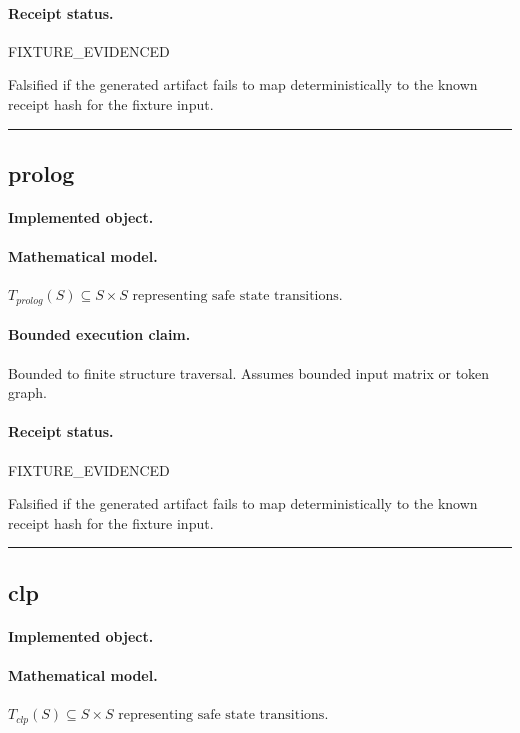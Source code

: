 \paragraph{Receipt status.} FIXTURE\_EVIDENCED
\begin{falsifier}
Falsified if the generated artifact fails to map deterministically to the known receipt hash for the fixture input.
\end{falsifier}

\vspace{1em}\hrule\vspace{1em}
\subsection{prolog}
\paragraph{Implemented object.} 
\paragraph{Mathematical model.} $T_{prolog}(S) \subseteq S \times S \text{ representing safe state transitions}.$
\paragraph{Bounded execution claim.} Bounded to finite structure traversal. Assumes bounded input matrix or token graph.
\paragraph{Receipt status.} FIXTURE\_EVIDENCED
\begin{falsifier}
Falsified if the generated artifact fails to map deterministically to the known receipt hash for the fixture input.
\end{falsifier}

\vspace{1em}\hrule\vspace{1em}
\subsection{clp}
\paragraph{Implemented object.} 
\paragraph{Mathematical model.} $T_{clp}(S) \subseteq S \times S \text{ representing safe state transitions}.$
